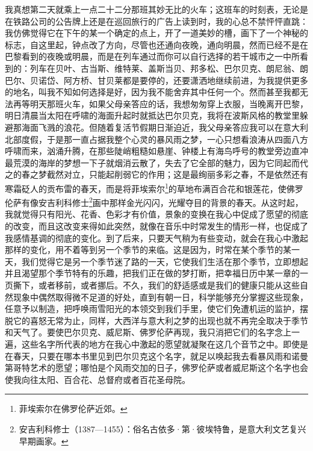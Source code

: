 \par 我真想第二天就乘上一点二十二分那班其妙无比的火车；这班车的时刻表，无论是在铁路公司的公告牌上还是在巡回旅行的广告上读到时，我的心总不禁怦怦直跳：我仿佛觉得它在下午的某一个确定的点上，开了一道美妙的槽，画下了一个神秘的标志，自这里起，钟点改了方向，尽管也还通向夜晚，通向明晨，然而已经不是在巴黎看到的夜晚或明晨，而是在列车通过而你可以自行选择的若干城市之一中所看到的：列车在贝叶、古当斯、维特莱、盖斯当贝、邦多松、巴尔贝克、朗尼翁、朗巴尔、贝诺岱、阿方桥、甘贝莱都是要停的，还要潇洒地继续前进，为我提供更多的地名，叫我不知如何选择是好，因为我不能舍弃其中任何一个。然而甚至我都无法再等明天那班火车，如果父母亲答应的话，我想匆匆穿上衣服，当晚离开巴黎，明日清晨当太阳在呼啸的海面升起时就抵达巴尔贝克，我将在波斯风格的教堂里躲避那海面飞溅的浪花。但随着复活节假期日渐迫近，我父母亲答应我可以在意大利北部度假，于是那一直占据我整个心灵的暴风雨之梦，一心只想看浪涛从四面八方呼啸而来，汹涌升腾，在那些陡峭粗糙如悬崖、钟楼上有海鸟呼号的教堂旁边直冲最荒漠的海岸的梦想一下子就烟消云散了，失去了它全部的魅力，因为它同起而代之的春之梦截然对立，只能起削弱它的作用；这是最绚丽多彩之春，不是依然还有寒霜砭人的贡布雷的春天，而是将菲埃索尔\footnote{菲埃索尔在佛罗伦萨近郊。}的草地布满百合花和银莲花，使佛罗伦萨有像安吉利科修士\footnote{安吉利科修士（1387—1455）：俗名古依多·第·彼埃特鲁，是意大利文艺复兴早期画家。}画中那样金光闪闪，光耀夺目的背景的春天。从这时起，我就觉得只有阳光、花香、色彩才有价值，景象的变换在我心中促成了愿望的彻底的改变，而且这改变来得如此突然，就像在音乐中时常发生的情形一样，也促成了我感情基调的彻底的变化。到了后来，只要天气稍为有些变动，就会在我心中激起那样的变化，用不着等到另一个季节的来临。这是因为，时常在某个季节的某一天，我们觉得它是另一个季节迷了路的一天，它使我们生活在那个季节，立即想起并且渴望那个季节特有的乐趣，把我们正在做的梦打断，把幸福日历中某一章的一页撕下，或者移前，或者挪后。不久，我们的舒适感或是我们的健康只能从这些自然现象中偶然取得微不足道的好处，直到有朝一日，科学能够充分掌握这些现象，任意予以制造，把呼唤雨雪阳光的本领交到我们手里，使它们免遭机运的监护，摆脱它的喜怒无常为止，同样，大西洋与意大利之梦的出现也就不再完全取决于季节和天气了。要使巴尔贝克、威尼斯、佛罗伦萨再现，我只消把它们的名字念上一遍，这些名字所代表的地方在我心中激起的愿望就凝聚在这几个音节之中。即使是在春天，只要在哪本书里见到巴尔贝克这个名字，就足以唤起我去看暴风雨和诺曼第哥特艺术的愿望；哪怕是个风雨交加的日子，佛罗伦萨或者威尼斯这个名字也会使我向往太阳、百合花、总督府或者百花圣母院。
